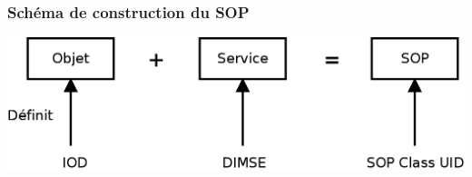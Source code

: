 	\frame
	{
		\frametitle{Sch\'ema de construction du SOP}
		\begin{center}
			\includegraphics[width=\linewidth]{./figures/sop-definition.png}
		\end{center}		
	}